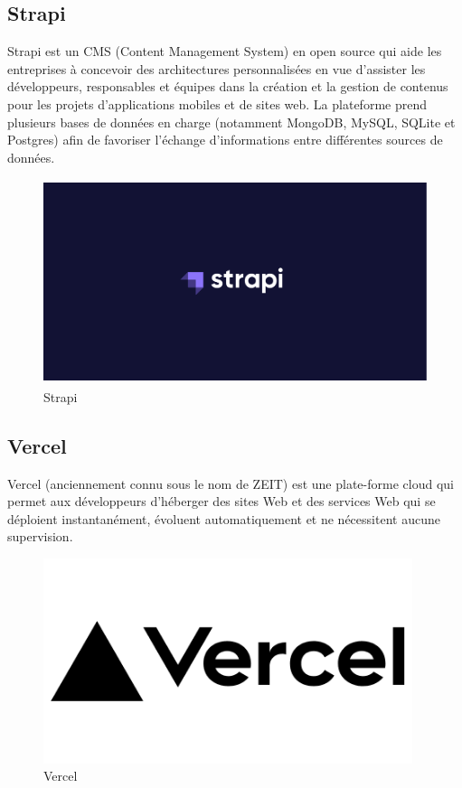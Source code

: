 \subsection{Strapi}

Strapi est un CMS (Content Management System) en open source qui aide les entreprises à concevoir des architectures personnalisées en vue d'assister les développeurs, responsables et équipes dans la création et la gestion de contenus pour les projets d'applications mobiles et de sites web. La plateforme prend plusieurs bases de données en charge (notamment MongoDB, MySQL, SQLite et Postgres) afin de favoriser l'échange d'informations entre différentes sources de données.

\begin{figure}[!h]
\begin{center}
\includegraphics[height=6cm]{strapi.png}
\end{center}
\caption{Strapi}
\end{figure}


\subsection{Vercel}

Vercel (anciennement connu sous le nom de ZEIT) est une plate-forme cloud qui permet aux développeurs d'héberger des sites Web et des services Web qui se déploient instantanément, évoluent automatiquement et ne nécessitent aucune supervision.

\begin{figure}[!h]
\begin{center}
\includegraphics[height=6cm]{vercel.png}
\end{center}
\caption{Vercel}
\end{figure}


